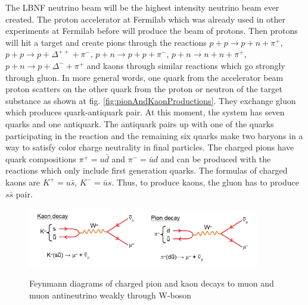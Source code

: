 The LBNF neutrino beam will be the highest intensity neutrino beam ever created. The proton accelerator at Fermilab which was already used in other experiments at Fermilab before will produce the beam of protons. Then protons will hit a target and create pions through the reactions $p+p \rightarrow p+n+\pi^+$, $p+p \rightarrow p+\Delta^{++}+\pi^-$, $p+n \rightarrow p+p+\pi^-$, $p+n \rightarrow n+n+\pi^+$, $p+n \rightarrow p+\Delta^{-}+\pi^+$ and kaons through similar reactions which go strongly through gluon. In more general words, one quark from the accelerator beam proton scatters on the other quark from the proton or neutron of the target substance as shown at fig. \ref{fig:pionAndKaonProductions}. They exchange gluon which produces quark-antiquark pair. At this moment, the system has seven quarks and one antiquark. The antiquark pairs up with one of the quarks participating in the reaction and the remaining six quarks make two baryons in a way to satisfy color charge neutrality in final particles.  The charged pions have quark compositions $\pi^+ = u\bar{d}$ and $\pi^- = \bar{u}d$ and can be produced with the reactions which only include first generation quarks. The formulas of charged kaons are $K^+ = u\bar{s}$, $K^- = \bar{u}s$. Thus, to produce kaons, the gluon has to produce $s\bar{s}$ pair. 

\begin{figure}
\caption{Feynmann diagrams of charged pion and kaon decays to muon and muon antineutrino weakly through W-boson}
\label{fig:pionAndKaonDecays}
\centering
\includegraphics[width=0.45\textwidth, keepaspectratio=true]{figs/kaonDecay.jpg}\includegraphics[width=0.45\textwidth, keepaspectratio=true]{figs/pionDecay.jpg} 
\end{figure}

